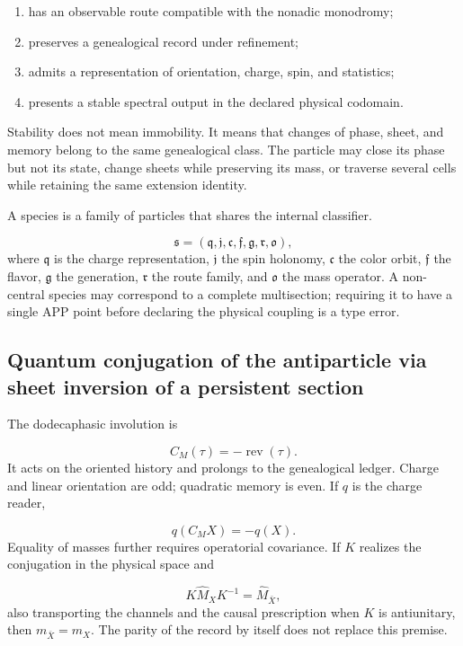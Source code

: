 \begin{enumerate}
\item has an observable route compatible with the nonadic monodromy;
\item preserves a genealogical record under refinement;
\item admits a representation of orientation, charge, spin, and statistics;
\item presents a stable spectral output in the declared physical codomain.
\end{enumerate}
Stability does not mean immobility. It means that changes of phase, sheet,
and memory belong to the same genealogical class. The particle may close
its phase but not its state, change sheets while preserving its mass, or
traverse several cells while retaining the same extension identity.

A species is a family of particles that shares the internal classifier.

\[
\mathfrak s=
(\mathfrak q,\mathfrak j,\mathfrak c,\mathfrak f,\mathfrak g,
\mathfrak r,\mathfrak o),
\]
where \(\mathfrak q\) is the charge representation, \(\mathfrak j\) the spin holonomy, \(\mathfrak c\) the color orbit, \(\mathfrak f\) the flavor, \(\mathfrak g\) the generation, \(\mathfrak r\) the route family, and \(\mathfrak o\) the mass operator. A non-central species may correspond to a complete multisection; requiring it to have a single APP point before declaring the physical coupling is a type error.

\subsection{Quantum conjugation of the antiparticle via sheet inversion of a persistent section}
The dodecaphasic involution is

\[
C_M(\tau)=-\operatorname{rev}(\tau).
\]
It acts on the oriented history and prolongs to the genealogical ledger. Charge and linear orientation are odd; quadratic memory is even. If \(q\) is the charge reader,

\[
q(C_MX)=-q(X).
\]
Equality of masses further requires operatorial covariance. If \(K\) realizes the conjugation in the physical space and

\[
K\widehat M_XK^{-1}=\widehat M_{\bar X},
\]
also transporting the channels and the causal prescription when \(K\) is antiunitary, then \(m_{\bar X}=m_X\). The parity of the record by itself does not replace this premise.

